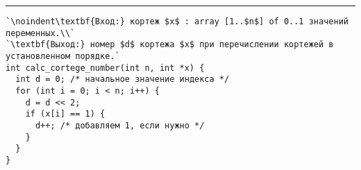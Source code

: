\documentclass{article}
\begin{document}
\vspace{5pt} \hrule
\begin{lstlisting}[caption={Вычисление номера кортежа в установленном порядке}, label=p134_calc_cortege_number, escapechar=`]
`\noindent\textbf{Вход:} кортеж $x$ : array [1..$n$] of 0..1 значений переменных.\\`
`\textbf{Выход:} номер $d$ кортежа $x$ при перечислении кортежей в установленном порядке.`
int calc_cortege_number(int n, int *x) {
  int d = 0; /* начальное значение индекса */
  for (int i = 0; i < n; i++) {
    d = d << 2;
    if (x[i] == 1) {
      d++; /* добавляем 1, если нужнo */
    }
  }
}
\end{lstlisting}
\end{document}
